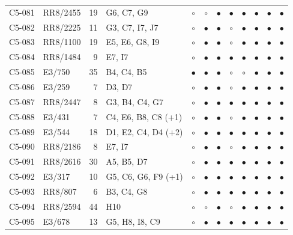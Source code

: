 {\begin{longtable}{llrp{3.9cm}cccccccc}
    C5-081 & RR8/2455 & 19 & G6, C7, G9 & $\circ$ & $\circ$ & $\bullet$ & $\bullet$ & $\bullet$ & $\bullet$ & $\bullet$ & $\bullet$ \\
    C5-082 & RR8/2225 & 11 & G3, C7, I7, J7 & $\circ$ & $\bullet$ & $\bullet$ & $\circ$ & $\bullet$ & $\bullet$ & $\bullet$ & $\bullet$ \\
    C5-083 & RR8/1100 & 19 & E5, E6, G8, I9 & $\circ$ & $\bullet$ & $\bullet$ & $\circ$ & $\bullet$ & $\bullet$ & $\bullet$ & $\bullet$ \\
    C5-084 & RR8/1484 & 9 & E7, I7 & $\circ$ & $\bullet$ & $\bullet$ & $\bullet$ & $\bullet$ & $\bullet$ & $\bullet$ & $\bullet$ \\
    C5-085 & E3/750 & 35 & B4, C4, B5 & $\bullet$ & $\bullet$ & $\bullet$ & $\circ$ & $\circ$ & $\bullet$ & $\bullet$ & $\bullet$ \\
    C5-086 & E3/259 & 7 & D3, D7 & $\circ$ & $\bullet$ & $\bullet$ & $\circ$ & $\bullet$ & $\bullet$ & $\bullet$ & $\bullet$ \\
    C5-087 & RR8/2447 & 8 & G3, B4, C4, G7 & $\circ$ & $\bullet$ & $\bullet$ & $\bullet$ & $\bullet$ & $\bullet$ & $\bullet$ & $\bullet$ \\
    C5-088 & E3/431 & 7 & C4, E6, B8, C8 (+1) & $\circ$ & $\bullet$ & $\bullet$ & $\circ$ & $\bullet$ & $\bullet$ & $\bullet$ & $\bullet$ \\
    C5-089 & E3/544 & 18 & D1, E2, C4, D4 (+2) & $\circ$ & $\bullet$ & $\bullet$ & $\bullet$ & $\bullet$ & $\bullet$ & $\bullet$ & $\bullet$ \\
    C5-090 & RR8/2186 & 8 & E7, I7 & $\circ$ & $\bullet$ & $\bullet$ & $\circ$ & $\bullet$ & $\bullet$ & $\bullet$ & $\bullet$ \\
    C5-091 & RR8/2616 & 30 & A5, B5, D7 & $\circ$ & $\bullet$ & $\bullet$ & $\bullet$ & $\bullet$ & $\bullet$ & $\bullet$ & $\bullet$ \\
    C5-092 & E3/317 & 10 & G5, C6, G6, F9 (+1) & $\circ$ & $\bullet$ & $\bullet$ & $\bullet$ & $\bullet$ & $\bullet$ & $\bullet$ & $\bullet$ \\
    C5-093 & RR8/807 & 6 & B3, C4, G8 & $\circ$ & $\bullet$ & $\bullet$ & $\bullet$ & $\bullet$ & $\bullet$ & $\bullet$ & $\bullet$ \\
    C5-094 & RR8/2594 & 44 & H10 & $\circ$ & $\circ$ & $\bullet$ & $\circ$ & $\bullet$ & $\bullet$ & $\bullet$ & $\bullet$ \\
    C5-095 & E3/678 & 13 & G5, H8, I8, C9 & $\circ$ & $\bullet$ & $\bullet$ & $\bullet$ & $\bullet$ & $\bullet$ & $\bullet$ & $\bullet$ \\

\end{longtable}}
